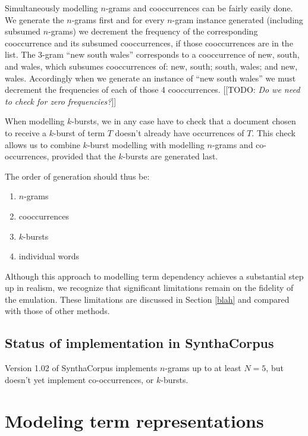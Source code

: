 \documentclass[11pt]{report}
\newcommand{\todo}[1]{{\color{blue}[[TODO: {\emph{#1}}]]}}
\begin{document}
Simultaneously modelling $n$-grams and cooccurrences can be fairly
easily done.   We generate the $n$-grams first and for every $n$-gram
instance generated (including subsumed $n$-grams) we decrement the
frequency of the corresponding cooccurrence and its subsumed cooccurrences, if those
cooccurrences are in the list.   The 3-gram ``new south wales''
corresponds to a cooccurrence of new, south, and wales, which subsumes
cooccurrences of: new, south; south, wales; and new, wales.
Accordingly when we generate an instance of ``new
south wales'' we must decrement the frequencies of each of those 4
cooccurrences.  \todo{Do we need to check for zero frequencies?}

When modelling $k$-bursts, we in any case have to check that a
document chosen to receive a $k$-burst of term $T$
doesn't already have occurrences of $T$.  This check allows us to
combine $k$-burst modelling with modelling $n$-grams and co-occurrences,
provided that the $k$-bursts are generated last.

The order of generation should thus be:

\begin{enumerate}
\item $n$-grams
\item cooccurrences
\item $k$-bursts
\item individual words
\end{enumerate}

Although this approach to modelling term dependency achieves a
substantial step up in realism, we recognize that significant
limitations remain on the fidelity of the emulation.  These
limitations are discussed in Section \ref{blah} and compared with
those of other methods.


\section{Status of implementation in SynthaCorpus}

Version 1.02 of SynthaCorpus implements $n$-grams up to at least $N=5$,
but doesn't yet implement co-occurrences, or $k$-bursts.





\chapter{Modeling term representations}   %
\label{TermReps}
\end{document}
